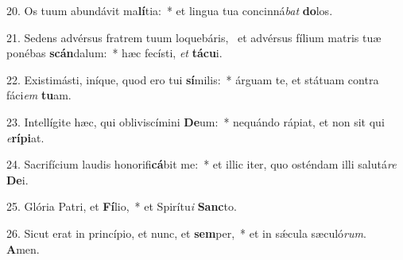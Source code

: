 20. Os tuum abundávit ma\textbf{lí}tia:~*  et lingua tua concinná\textit{bat} \textbf{do}los.\

21. Sedens advérsus fratrem tuum loquebáris, \dag\  et advérsus fílium matris tuæ ponébas \textbf{scán}dalum:~*  hæc fecísti, \textit{et} \textbf{tá}\textbf{cu}i.\

22. Existimásti, iníque, quod ero tui \textbf{sí}milis:~*  árguam te, et státuam contra fáci\textit{em} \textbf{tu}am.\

23. Intellígite hæc, qui obliviscímini \textbf{De}um:~*  nequándo rápiat, et non sit qui \textit{e}\textbf{rí}\textbf{pi}at.\

24. Sacrifícium laudis honorifi\textbf{cá}bit me:~*  et illic iter, quo osténdam illi salutá\textit{re} \textbf{De}i.\

25. Glória Patri, et \textbf{Fí}lio,~*  et Spirítu\textit{i} \textbf{Sanc}to.\

26. Sicut erat in princípio, et nunc, et \textbf{sem}per,~*  et in sǽcula sæculó\textit{rum}. \textbf{A}men.\

